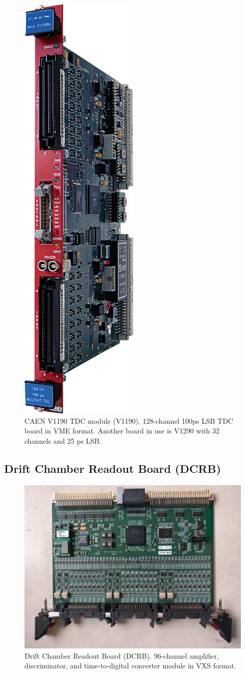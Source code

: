 \begin{figure}[hbt]
	\centering
	\includegraphics[width=0.2\columnwidth,keepaspectratio]{img/v1190_board.jpg}
	\caption{CAEN V1190 TDC module (V1190). 128-channel 100ps LSB TDC board in VME format. Another board in use is V1290 with 32 channels and 25 ps LSB.}
	\label{fig:v1190_board}
\end{figure}

\subsection{Drift Chamber Readout Board (DCRB)}

\begin{figure}[hbt]
	\centering
	\includegraphics[width=1.0\columnwidth,keepaspectratio]{img/dcrb_board.png}
	\caption{Drift Chamber Readout Board (DCRB). 96-channel amplifier, discriminator, and time-to-digital converter module in VXS format.}
	\label{fig:dcrb_board}
\end{figure}


